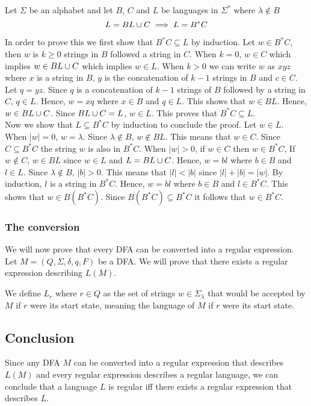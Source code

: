 \documentclass{article}
\newcommand{\emptyString}{\lambda}
\begin{document}
Let \(\Sigma\) be an alphabet and let \(B\), \(C\) and \(L\) be languages in \(\Sigma^*\) where \(\emptyString \notin B\)
\[
    L=BL\cup C \implies L=B^*C
\]

In order to prove this we first show that \(B^*C \subseteq L\) by induction.
Let \(w \in B^*C\), then \(w\) is \(k\geq 0\) strings in \(B\) followed a string in \(C\).
When \(k=0\), \(w \in C\) which implies \(w \in BL\cup C\) which implies \(w \in L\).
When \(k > 0\) we can write \(w\) as \(xyz\) where \(x\) is a string in \(B\),
\(y\) is the concatenation of \(k-1\) strings in \(B\) and \(c \in C\).
Let \(q=yz\). Since \(q\) is a concatenation of \(k-1\) strings of \(B\) followed by a string in \(C\),
\(q \in L\). Hence, \(w=xq\) where \(x\in B\) and \(q\in L\). This shows that \(w \in BL\).
Hence, \(w \in BL\cup C\). Since \(BL \cup C = L\), \(w \in L\). This proves that
\(B^*C\subseteq L\). \\
Now we show that \(L \subseteq B^*C\) by induction to conclude the proof.
Let \(w\in L\). When \(|w|=0\), \(w=\emptyString\). Since \(\emptyString \notin B\),
\(w \notin BL\). This means that \(w\in C\). Since \(C \subseteq B^*C\) the string \(w\)
is also in \(B^*C\). When \(|w| > 0\), if \(w \in C\) then \(w \in B^*C\),
If \(w \notin C\), \(w \in BL\) since \(w \in L\) and \(L=BL\cup C\).
Hence, \(w=bl\) where \(b\in B\) and \(l\in L\).
Since \(\emptyString \notin B\), \(|b|>0\). This means that \(|l|<|b|\)
since \(|l|+|b|=|w|\). By induction, \(l\) is a string in \(B^*C\).
Hence, \(w = bl\) where \(b\in B\) and \(l\in B^*C\). This shows that \(w \in B(B^*C)\).
Since \(B(B^*C) \subseteq B^*C\) it follows that \(w \in B^*C\).

\subsubsection{The conversion}

We will now prove that every DFA can be converted into a regular expression.
Let \(M=(Q, \Sigma, \delta, q, F)\) be a DFA. We will prove that there exists a regular
expression describing \(L(M)\).

We define \(L_r\) where \(r \in Q\) as the set of strings \(w \in \Sigma_\emptyString\)
that would be accepted by \(M\) if \(r\) were its start state, meaning the language of \(M\)
if \(r\) were its start state.


\subsection{Conclusion}

Since any DFA \(M\) can be converted into a regular expression that describes \(L(M)\)
and every regular expression describes a regular language, we can conclude that a language \(L\)
is regular iff there exists a regular expression that describes \(L\).
\end{document}
